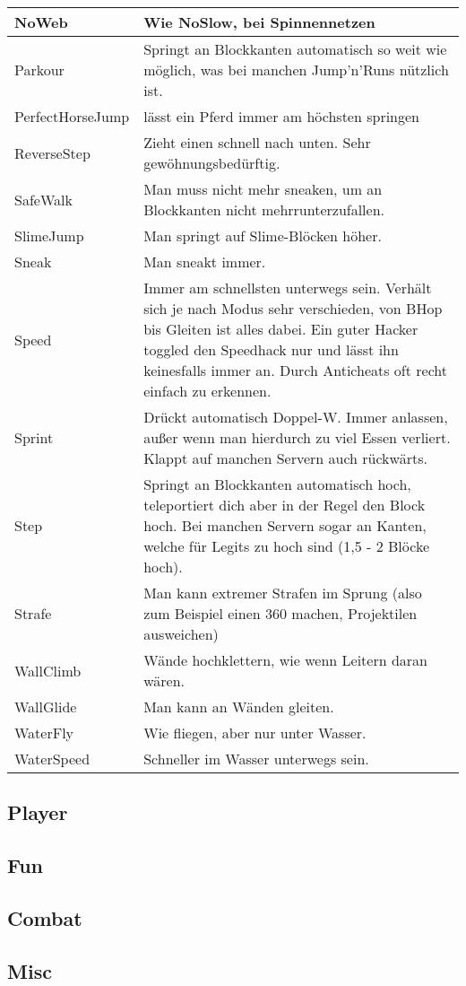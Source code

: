 \begin{longtable}{p{3cm}|p{10cm}}
\hline
\rowcolor{lime!50}NoWeb & Wie NoSlow, bei Spinnennetzen \\
\hline
Parkour & Springt an Blockkanten automatisch so weit wie möglich, was bei manchen Jump'n'Runs nützlich ist. \\
\hline
PerfectHorseJump & lässt ein Pferd immer am höchsten springen \\
\hline
ReverseStep & Zieht einen schnell nach unten. Sehr gewöhnungsbedürftig. \\
\hline
SafeWalk & Man muss nicht mehr sneaken, um an Blockkanten nicht mehrrunterzufallen. \\
\hline
SlimeJump & Man springt auf Slime-Blöcken höher. \\
\hline
Sneak & Man sneakt immer. \\
\hline
\rowcolor{lime!50}Speed & Immer am schnellsten unterwegs sein. Verhält sich je nach Modus sehr verschieden, von BHop bis Gleiten ist alles dabei. Ein guter Hacker toggled den Speedhack nur und lässt ihn keinesfalls immer an. Durch Anticheats oft recht einfach zu erkennen. \\
\hline
\rowcolor{lime!50}Sprint & Drückt automatisch Doppel-W. Immer anlassen, außer wenn man hierdurch zu viel Essen verliert. Klappt auf manchen Servern auch rückwärts. \\
\hline
\rowcolor{lime!50}Step & Springt an Blockkanten automatisch hoch, teleportiert dich aber in der Regel den Block hoch. Bei manchen Servern sogar an Kanten, welche für Legits zu hoch sind (1,5 - 2 Blöcke hoch). \\
\hline
Strafe & Man kann extremer Strafen im Sprung (also zum Beispiel einen 360 machen, Projektilen ausweichen) \\
\hline
WallClimb & Wände hochklettern, wie wenn Leitern daran wären. \\
\hline
WallGlide & Man kann an Wänden gleiten. \\
\hline
WaterFly & Wie fliegen, aber nur unter Wasser. \\
\hline
WaterSpeed & Schneller im Wasser unterwegs sein. \\
\end{longtable}

\subsection{Player}

\subsection{Fun}

\subsection{Combat}

\subsection{Misc}